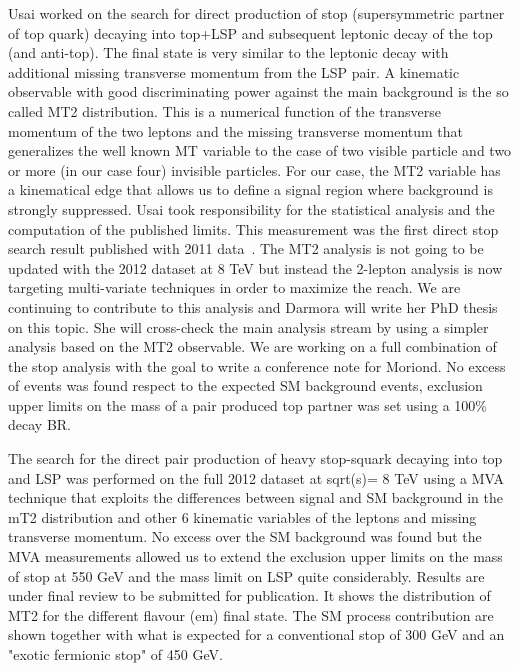 

Usai worked on the search for direct production of stop
(supersymmetric partner of top quark) decaying into top+LSP and
subsequent leptonic decay of the top (and anti-top). The final state
is very similar to the leptonic decay with additional missing
transverse momentum from the LSP pair. A kinematic observable with
good discriminating power against the main background is the so called
MT2 distribution. This is a numerical function of the transverse
momentum of the two leptons and the missing transverse momentum that
generalizes the well known MT variable to the case of two visible
particle and two or more (in our case four) invisible particles. For
our case, the MT2 variable has a kinematical edge that allows us to
define a signal region where background is strongly suppressed.  Usai
took responsibility for the statistical analysis and the computation
of the published limits. This measurement was the first direct stop
search result published with 2011 data~\cite{Aad:2012uu}. The MT2 analysis is
not going to be updated with the 2012 dataset at 8 TeV but instead the
2-lepton analysis is now targeting multi-variate techniques in order
to maximize the reach. We are continuing to contribute to this
analysis and Darmora will write her PhD thesis on this topic. She will
cross-check the main analysis stream by using a simpler analysis based
on the MT2 observable. We are working on a full combination of the
stop analysis with the goal to write a conference note for Moriond.
No excess of events was found respect to the expected SM
background events, exclusion upper limits on the mass of a pair
produced top partner was set using a 100\% decay BR.

The search for the direct pair production of heavy stop-squark
decaying into top and LSP was performed on the full 2012 dataset
at sqrt(s)= 8 TeV using a MVA technique that exploits the differences
between signal and SM background in the mT2 distribution and other 6
kinematic variables of the leptons and missing transverse momentum.
No excess over the SM background was found but the MVA measurements
allowed us to extend the exclusion upper limits on the mass of stop at 550
GeV and the mass limit on LSP quite considerably.  Results 
are under final review to be
submitted for publication. It shows the
distribution of MT2 for the different flavour (em) final state. The SM
process contribution are shown together with what is expected for a
conventional stop of 300 GeV and an "exotic fermionic stop" of 450
GeV.

